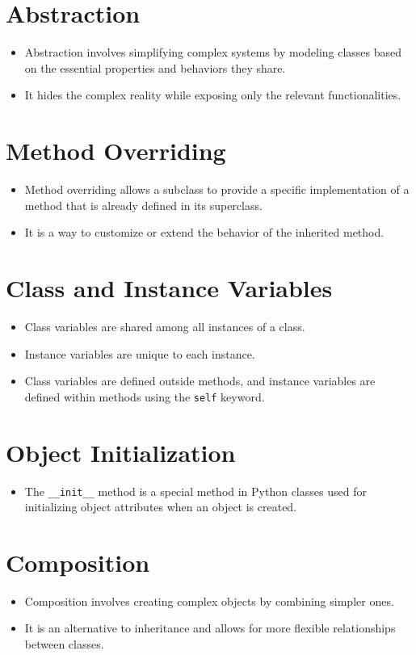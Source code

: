 \documentclass{article}
\begin{document}
\section{Abstraction}
\begin{itemize}
    \item Abstraction involves simplifying complex systems by modeling classes based on the essential properties and behaviors they share.
    \item It hides the complex reality while exposing only the relevant functionalities.
\end{itemize}

\section{Method Overriding}
\begin{itemize}
    \item Method overriding allows a subclass to provide a specific implementation of a method that is already defined in its superclass.
    \item It is a way to customize or extend the behavior of the inherited method.
\end{itemize}

\section{Class and Instance Variables}
\begin{itemize}
    \item Class variables are shared among all instances of a class.
    \item Instance variables are unique to each instance.
    \item Class variables are defined outside methods, and instance variables are defined within methods using the \texttt{self} keyword.
\end{itemize}

\section{Object Initialization}
\begin{itemize}
    \item The \texttt{\_\_init\_\_} method is a special method in Python classes used for initializing object attributes when an object is created.
\end{itemize}

\section{Composition}
\begin{itemize}
    \item Composition involves creating complex objects by combining simpler ones.
    \item It is an alternative to inheritance and allows for more flexible relationships between classes.
\end{itemize}
\end{document}
